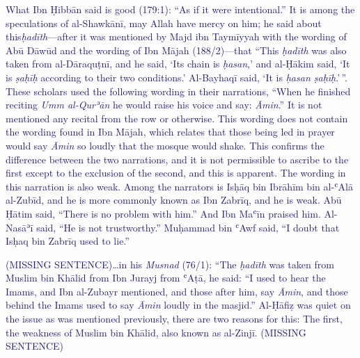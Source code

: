 \textcolor{MidnightBlue}{What Ibn Ḥibbān said
is good (179:1): ``As if it were intentional.'' It is among the
speculations of al-Shawkānī, may Allah have mercy on him; he said about
this\emph{ḥadīth}---after it was mentioned by Majd ibn Taymīyyah with the
wording of Abū Dāwūd and the wording of Ibn Mājah (188/2)---that ``This \emph{ḥadīth} was also taken from al-Dāraquṭnī, and he
said, `Its chain is \emph{ḥasan},' and al-Ḥākim said, `It is
\emph{ṣaḥīḥ} according to their two conditions.' Al-Bayhaqī said, `It is
\emph{ḥasan ṣaḥīḥ}.'\,''. These scholars used the following wording in
their narrations, ``When he \pbuh finished reciting \emph{Umm al-Qurʾān}
he would raise his voice and say: \emph{Āmin}.'' It is not mentioned any
recital from the row or otherwise. This wording does not contain the
wording found in Ibn Mājah, which relates that those being led in prayer
would say \emph{Āmin} so loudly that the mosque would shake. This
confirms the difference between the two narrations, and it is not
permissible to ascribe to the first except to the exclusion of the
second, and this is apparent. The wording in this narration is also
weak. Among the narrators is Isḥāq bin Ibrāhīm bin al-ʿAlā al-Zubīd, and
he is more commonly known as Ibn Zabrīq, and he is weak. Abū Ḥātim said,
``There is no problem with him.'' And Ibn Maʿīn praised him. Al-Nasāʾī
said, ``He is not trustworthy.'' Muḥammad bin ʿAwf said, ``I doubt that
Isḥaq bin Zabrīq used to lie.''}

\textcolor{MidnightBlue}{(MISSING SENTENCE)\ldots{}in
his \emph{Musnad} (76/1): ``The \emph{ḥadīth} was taken from Muslim bin
Khālid from Ibn Jurayj from ʿAṭā, he said: ``I used to hear the Imams,
and Ibn al-Zubayr mentioned, and those after him, say \emph{Āmin}, and
those behind the Imams used to say \emph{Āmin} loudly in the masjid.''
Al-Ḥāfiẓ was quiet on the issue as was mentioned previously, there are
two reasons for this: The first, the weakness of Muslim bin Khālid, also
known as al-Zinjī. (MISSING SENTENCE)}

